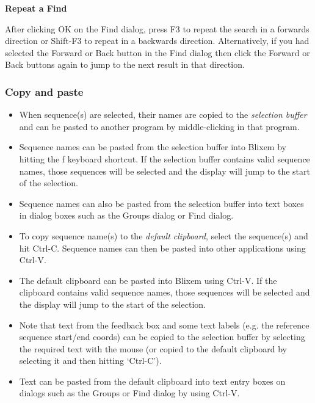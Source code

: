 \documentclass[letterpaper]{article}
\newcommand\liststyleWWviiiNumxxvi{%
\renewcommand\labelitemi{{\textbullet}}
\renewcommand\labelitemii{o}
\renewcommand\labelitemiii{[F0A7?]}
\renewcommand\labelitemiv{[F0B7?]}
}
\begin{document}
\bigskip

{\bfseries
Repeat a Find}

After clicking OK on the Find dialog, press F3 to repeat the search in a
forwards direction or Shift-F3 to repeat in a backwards direction.
Alternatively, if you had selected the Forward or Back button in the
Find dialog then click the Forward or Back buttons again to jump to the
next result in that direction.

{\color[rgb]{0.30980393,0.5058824,0.7411765}\subsubsection[Copy and paste]{Copy and paste}}
\hypertarget{RefHeading1981056909880}{}\liststyleWWviiiNumxxvi
\begin{itemize}
\item {
When sequence(s) are selected, their names are copied to the
\textit{selection buffer }and can be pasted to another program by
middle-clicking in that program.}
\item {
Sequence names can be pasted from the selection buffer into Blixem by
hitting the {\textquotesingle}f{\textquotesingle} keyboard shortcut. If
the selection buffer contains valid sequence names, those sequences
will be selected and the display will jump to the start of the
selection.}
\item {
Sequence names can also be pasted from the selection buffer into text
boxes in dialog boxes such as the Groups dialog or Find dialog.}
\item {
To copy sequence name(s) to the \textit{default clipboard}, select the
sequence(s) and hit Ctrl-C. Sequence names can then be pasted into
other applications using Ctrl-V.}
\item {
The default clipboard can be pasted into Blixem using Ctrl-V. If the
clipboard contains valid sequence names, those sequences will be
selected and the display will jump to the start of the selection.}
\item {
Note that text from the feedback box and some text labels (e.g. the
reference sequence start/end coords) can be copied to the selection
buffer by selecting the required text with the mouse (or copied to the
default clipboard by selecting it and then hitting
{\textquoteleft}Ctrl-C{\textquoteright}).}
\item {
Text can be pasted from the default clipboard into text entry boxes on
dialogs such as the Groups or Find dialog by using Ctrl-V.}
\end{itemize}
\end{document}
